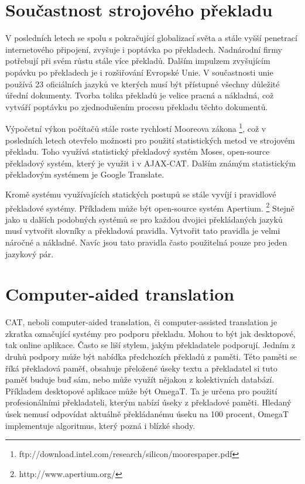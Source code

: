 \documentclass[12pt,a4paper]{report}
\begin{document}
\section{Součastnost strojového překladu}
V posledních letech se spolu s pokračující globalizací světa a stále vyšší penetrací internetového připojení, zvyšuje i poptávka po překladech. Nadnárodní firmy potřebují při svém růstu stále více překladů. Dalším impulzem zvyšujícím popávku po překladech je i rozšiřování Evropské Unie. V součastnosti unie používá 23 oficiálních jazyků ve kterých musí být přístupné všechny důležité úřední dokumenty. Tvorba tolika překladů je velice pracná a nákladná, což vytváří poptávku po zjednodušením procesu překladu těchto dokumentů.

Výpočetní výkon počítačů stále roste rychlostí Mooreova zákona \footnote{ftp://download.intel.com/research/silicon/moorespaper.pdf}, což v posledních letech otevřelo možnosti pro použití statistických metod ve strojovém překladu. Toho využívá statistický překladový systém Moses, open-source překladový systém, který je využit i v AJAX-CAT. Dalším známým statistickým překladovým systémem je Google Translate.

Kromě systému využívajících statických postupů se stále vyvíjí i pravidlové překladové systémy. Příkladem může být open-source systém Apertium. \footnote{http://www.apertium.org/} Stejně jako u dalších podobných systémů se pro každou dvojici překládaných jazyků musí vytvořit slovníky a překladová pravidla. Vytvořit tato pravidla je velmi náročné a nákladné. Navíc jsou tato pravidla často použitelná pouze pro jeden jazykový pár.

\section{Computer-aided translation}
CAT, neboli computer-aided translation, či computer-assisted translation je zkratka označující systémy pro podporu překladu. Mohou to být jak desktopové, tak online aplikace. Často se liší stylem, jakým překladatele podporují. Jedním z druhů podpory může být nabídka předchozích překladů z paměti. Této paměti se říká překladová paměť, obsahuje přeložené úseky textu a překladatel si tuto paměť buduje buď sám, nebo může využít nějakou z kolektivních databází. Příkladem desktopové aplikace může být OmegaT. Ta je určena pro použití profesionálními překladateli, kterým nabízí úseky z překladové paměti. Hledaný úsek nemusí odpovídat aktuálně překládanému úseku na 100 procent, OmegaT implementuje algoritmus, který pozná i blízké shody.
\end{document}
